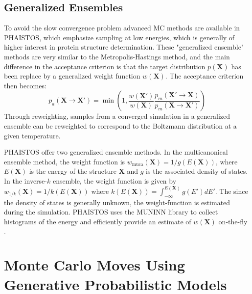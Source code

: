 \subsection{Generalized Ensembles}
To avoid the slow convergence problem advanced MC methods are available in PHAISTOS, which emphasize sampling at low energies, which is generally of higher interest in protein structure determination.
These "generalized ensemble" methods are very similar to the Metropolis-Hastings method, and the main difference in the acceptance criterion is that the target distribution $p(\mathbf{X})$ has been replace by a generalized weight function $w(\mathbf{X})$. 
The acceptance criterion then becomes:
\begin{equation}
    \label{eq:mc_gh}
    p_a(\mathbf{X} \rightarrow \mathbf{X'}) = \min \left( 1,
    \frac{w(\mathbf{X'})}
         {w(\mathbf{X})}
    \frac{p_m(\mathbf{X'} \rightarrow \mathbf{X})}
         {p_m(\mathbf{X} \rightarrow \mathbf{X'})} \right)
\end{equation}
Through reweighting, samples from a converged simulation in a generalized ensemble can be reweighted to correspond to the Boltzmann distribution at a given temperature.

PHAISTOS offer two generalized ensemble methods.
In the multicanonical ensemble method, the weight function is $w_\mathrm{muca}(\mathbf{X}) = 1/g(E(\mathbf{X}))$, where $E(\mathbf{X})$ is the energy of the structure $\mathbf{X}$ and $g$ is the associated density of states.
In the inverse-$k$ ensemble, the weight function is given by $w_\textit{1/k}(\mathbf{X}) = 1/k(E(\mathbf{X}))$ where $k(E(\mathbf{X})) = \int_{-\infty}^{E(\mathbf{X})} g(E') dE'$.
The since the density of states is generally unknown, the weight-function is estimated during the simulation.
PHAISTOS uses the MUNINN library to collect histograms of the energy and efficiently provide an estimate of $w(\mathbf{X})$ on-the-fly \cite{muninn}.
\clearpage

\section{Monte Carlo Moves Using Generative Probabilistic Models}
\label{chap:generative}

